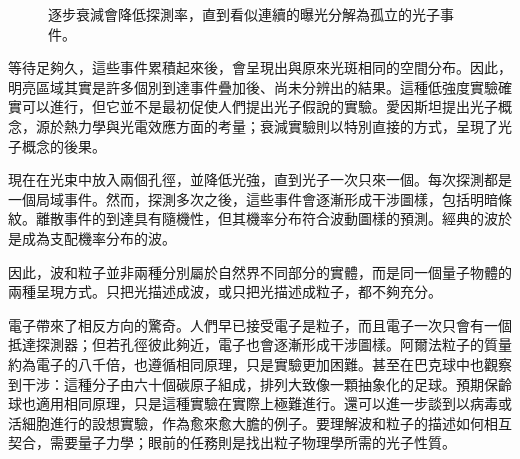 \begin{figure}[h]
\centering
{}
\caption{逐步衰減會降低探測率，直到看似連續的曝光分解為孤立的光子事件。}
\end{figure}

等待足夠久，這些事件累積起來後，會呈現出與原來光斑相同的空間分布。因此，明亮區域其實是許多個別到達事件疊加後、尚未分辨出的結果。這種低強度實驗確實可以進行，但它並不是最初促使人們提出光子假說的實驗。愛因斯坦提出光子概念，源於熱力學與光電效應方面的考量；衰減實驗則以特別直接的方式，呈現了光子概念的後果。

現在在光束中放入兩個孔徑，並降低光強，直到光子一次只來一個。每次探測都是一個局域事件。然而，探測多次之後，這些事件會逐漸形成干涉圖樣，包括明暗條紋。離散事件的到達具有隨機性，但其機率分布符合波動圖樣的預測。經典的波於是成為支配機率分布的波。

因此，波和粒子並非兩種分別屬於自然界不同部分的實體，而是同一個量子物體的兩種呈現方式。只把光描述成波，或只把光描述成粒子，都不夠充分。

電子帶來了相反方向的驚奇。人們早已接受電子是粒子，而且電子一次只會有一個抵達探測器；但若孔徑彼此夠近，電子也會逐漸形成干涉圖樣。阿爾法粒子的質量約為電子的八千倍，也遵循相同原理，只是實驗更加困難。甚至在巴克球中也觀察到干涉：這種分子由六十個碳原子組成，排列大致像一顆抽象化的足球。預期保齡球也適用相同原理，只是這種實驗在實際上極難進行。還可以進一步談到以病毒或活細胞進行的設想實驗，作為愈來愈大膽的例子。要理解波和粒子的描述如何相互契合，需要量子力學；眼前的任務則是找出粒子物理學所需的光子性質。

